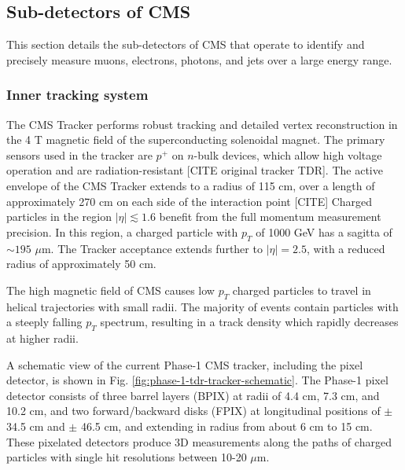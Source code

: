 \documentclass{article}
\begin{document}
\subsection{Sub-detectors of CMS}
This section details the sub-detectors of CMS that operate to identify and precisely measure muons, electrons, photons, and jets over a large energy range. 

\subsubsection{Inner tracking system}
The CMS Tracker performs robust tracking and detailed vertex reconstruction in the 4 T magnetic field of the superconducting solenoidal magnet. The primary sensors used in the tracker are $p^+$ on $n$-bulk devices, which allow high voltage operation and are radiation-resistant [CITE original tracker TDR]. The active envelope of the CMS Tracker extends to a radius of 115 cm, over a length of approximately 270 cm on each side of the interaction point [CITE] %
Charged particles in the region $|\eta| \lesssim 1.6$ benefit from the full momentum measurement precision. In this region, a charged particle with $p_T$ of 1000 GeV has a sagitta of $\sim 195$ $\mu$m. The Tracker acceptance extends further to $|\eta| = 2.5$, with a reduced radius of approximately 50 cm.

The high magnetic field of CMS causes low $p_{T}$ charged particles to travel in helical trajectories with small radii. The majority of events contain particles with a steeply falling $p_{T}$ spectrum, resulting in a track density which rapidly decreases at higher radii. 

A schematic view of the current Phase-1 CMS tracker, including the pixel detector, is shown in Fig. \ref{fig:phase-1-tdr-tracker-schematic}. The Phase-1 pixel detector consists of three barrel layers (BPIX) at radii of 4.4 cm, 7.3 cm, and 10.2 cm, and two forward/backward disks (FPIX) at longitudinal positions of $\pm$ 34.5 cm and $\pm$ 46.5 cm, and extending in radius from about 6 cm to 15 cm. These pixelated detectors produce 3D measurements along the paths of charged particles with single hit resolutions between 10-20 $\mu$m. 
\end{document}
